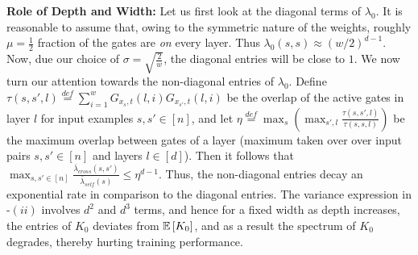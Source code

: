 \textbf{Role of Depth and Width:} Let us first look at the diagonal terms of $\lambda_0$. It is reasonable to assume that, owing to the symmetric nature of the weights, roughly $\mu=\frac{1}{2}$ fraction of the gates are \emph{on} every layer. Thus $\lambda_0(s,s)\approx (w/2)^{d-1}$. Now, due our choice of $\sigma=\sqrt{\frac{2}{w}}$, the diagonal entries will be close to $1$. We now turn our attention towards the non-diagonal entries of $\lambda_0$. Define $\tau(s,s',l)\stackrel{def}=\sum_{i=1}^w G_{x_s,t}(l,i)G_{x_{s'},t}(l,i)$ be the overlap of the active gates in layer $l$ for input examples $s,s'\in[n]$, and  let $\eta\stackrel{def}=\max_s\left(\max_{s',l} \frac{\tau(s,s',l)}{\tau(s,s,l)}\right)$ be the maximum overlap between gates of a layer (maximum taken over over input pairs $s,s'\in[n]$ and layers $l\in [d]$).  Then it follows that $\max_{s,s'\in [n]} \frac{\bar{\lambda}_{cross}(s,s')}{\bar{\lambda}_{self}(s)}\leq \eta^{d-1}$. Thus, the non-diagonal entries decay an exponential rate in comparison to the diagonal entries. The variance expression in -$(ii)$ involves $d^2$ and $d^3$ terms, and hence for a fixed width as depth increases, the entries of $K_0$ deviates from $\mathbb{E}\left[K_0\right]$, and as a result the spectrum of $K_0$ degrades, thereby hurting training performance.\\
